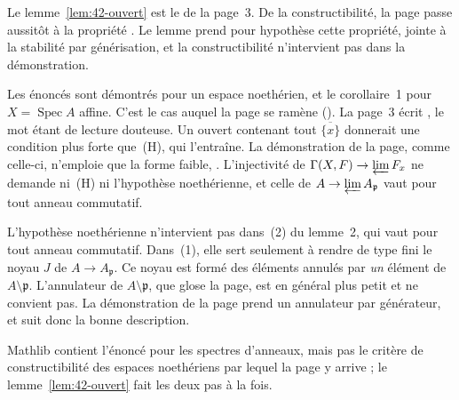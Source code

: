 \begin{remarque}
Le lemme~\ref{lem:42-ouvert} est le  de la page~3. De la constructibilité, la page passe aussitôt à la propriété . Le lemme prend pour hypothèse cette propriété, jointe à la stabilité par générisation, et la constructibilité n'intervient pas dans la démonstration.
\end{remarque}

\begin{remarque}
Les énoncés sont démontrés pour un espace noethérien, et le corollaire~1 pour $X = \operatorname{Spec} A$ affine. C'est le cas auquel la page se ramène (). La page~3 écrit , le mot  étant de lecture douteuse. Un ouvert contenant tout $\overline{\{x\}}$ donnerait une condition plus forte que~(H), qui l'entraîne. La démonstration de la page, comme celle-ci, n'emploie que la forme faible, . L'injectivité de $\Gamma(X,F) \to \varprojlim F_x$ ne demande ni~(H) ni l'hypothèse noethérienne, et celle de $A \to \varprojlim A_{\mathfrak p}$ vaut pour tout anneau commutatif.
\end{remarque}

\begin{remarque}
L'hypothèse noethérienne n'intervient pas dans~(2) du lemme~2, qui vaut pour tout anneau commutatif. Dans~(1), elle sert seulement à rendre de type fini le noyau $J$ de $A \to A_{\mathfrak p}$. Ce noyau est formé des éléments annulés par \emph{un} élément de $A \setminus \mathfrak p$. L'annulateur de $A \setminus \mathfrak p$, que glose la page, est en général plus petit et ne convient pas. La démonstration de la page prend un annulateur par générateur, et suit donc la bonne description.
\end{remarque}

\begin{remarque}
Mathlib contient l'énoncé  pour les spectres d'anneaux, mais pas le critère de constructibilité des espaces noethériens par lequel la page y arrive ; le lemme~\ref{lem:42-ouvert} fait les deux pas à la fois.
\end{remarque}


